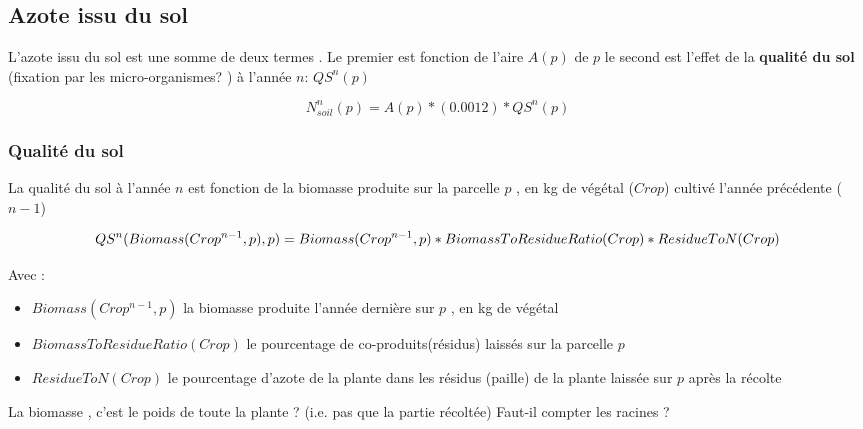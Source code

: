 \documentclass[10pt,a4paper,french]{article} %
\begin{document}
\subsection{Azote issu du sol}


L'azote issu du sol est une somme de deux termes . Le premier est fonction de l'aire $A(p)$ de $p$ le second est l'effet de la \textbf{qualité du sol} (fixation par les micro-organismes? ) à l'année $n$:  $QS^{n}(p)$

\begin{equation}
N_{soil}^{n}(p) = A(p)*(0.0012 ) * QS^{n}(p)
\end{equation}



\subsubsection{Qualité du sol}

La qualité du sol à l'année $n$ est fonction de la biomasse produite sur la parcelle $p$ , en kg de végétal ($Crop$) cultivé l'année précédente ($n-1$)


\begin{equation}
QS^{n}(Biomass(Crop^{n-1},p),p) = Biomass(Crop^{n-1},p) * BiomassToResidueRatio(Crop) * ResidueToN(Crop)  \\
\end{equation}

Avec  :

\begin{itemize}
	\item $Biomass(Crop^{n-1},p)$  la biomasse produite l'année dernière sur $p$ , en kg de végétal
	\item $BiomassToResidueRatio(Crop)$ le pourcentage de co-produits(résidus) laissés sur la parcelle $p$ 
	\item $ResidueToN(Crop)$  le pourcentage d'azote de la plante dans les résidus (paille) de la plante laissée sur  $p$ après la récolte
\end{itemize}



\begin{tcolorbox}[noparskip,
    colback=LightGreen,colframe=DarkGreen,%
    colbacklower=LimeGreen!75!LightGreen,%
    title=Question]
La biomasse , c'est le poids de toute la plante ? (i.e. pas que la partie  récoltée)
Faut-il compter les racines ? 
\end{tcolorbox}
\end{document}
